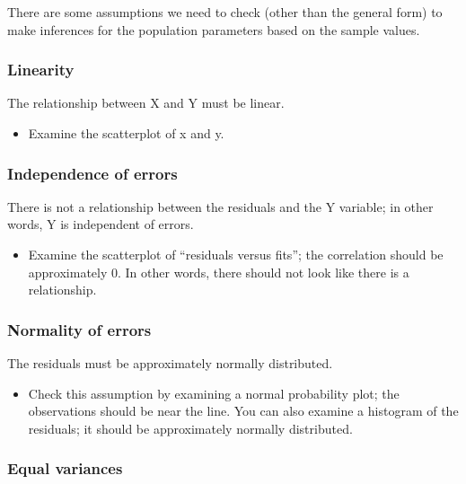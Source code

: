 \documentclass[
]{article}
\providecommand{\tightlist}{%
  \setlength{\itemsep}{0pt}\setlength{\parskip}{0pt}}
\begin{document}
There are some assumptions we need to check (other than the general form) to make inferences for the population parameters based on the sample values.

\hypertarget{linearity-reg}{%
\subsubsection{Linearity}\label{linearity-reg}}

The relationship between X and Y must be linear.

\begin{itemize}
\tightlist
\item
  Examine the scatterplot of x and y.
\end{itemize}

\hypertarget{independence-of-errors-reg}{%
\subsubsection{Independence of errors}\label{independence-of-errors-reg}}

There is not a relationship between the residuals and the Y variable; in other words, Y is independent of errors.

\begin{itemize}
\tightlist
\item
  Examine the scatterplot of ``residuals versus fits''; the correlation should be approximately 0. In other words, there should not look like there is a relationship.
\end{itemize}

\hypertarget{normality-of-errors}{%
\subsubsection{Normality of errors}\label{normality-of-errors}}

The residuals must be approximately normally distributed.

\begin{itemize}
\tightlist
\item
  Check this assumption by examining a normal probability plot; the observations should be near the line. You can also examine a histogram of the residuals; it should be approximately normally distributed.
\end{itemize}

\hypertarget{equal-variances}{%
\subsubsection{Equal variances}\label{equal-variances}}
\end{document}

